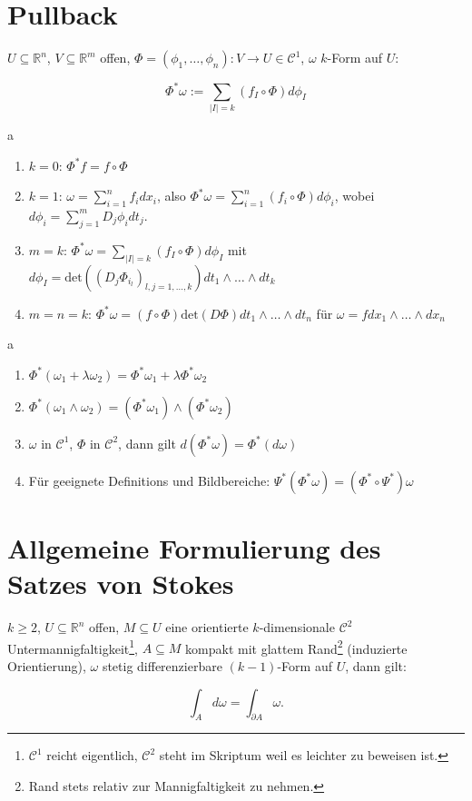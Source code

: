 \section{Pullback}
\begin{definition}[Pullback]
	$U\subseteq\mathbb R^n$, $V\subseteq\mathbb R^m$ offen, $\Phi = (\phi_1,\dots,\phi_n):V\rightarrow U \in \mathcal C^1$, $\omega$ $k$-Form auf $U$:

$$\Phi^*\omega := \sum_{|I|=k} (f_I\circ\Phi)d\phi_I$$
\end{definition}
\begin{remark}a\newline
	\begin{enumerate}
		\item $k=0$: $\Phi^*f = f\circ\Phi$
		\item $k=1$: $\omega = \sum_{i=1}^n f_i dx_i$, also $\Phi^*\omega = \sum_{i=1}^n (f_i\circ\Phi) d\phi_i$, wobei $d\phi_i = \sum_{j=1}^m D_j\phi_i dt_j$.
		\item $m=k$: $\Phi^*\omega = \sum_{|I|=k}(f_I\circ \Phi)d\phi_I$ mit $d\phi_I = \text{det}((D_j\Phi_{i_l})_{l,j=1,\dots,k})dt_1\wedge\dots\wedge dt_k$
		\item $m=n=k$: $\Phi^*\omega = (f\circ\Phi)\text{det}(D\Phi)dt_1\wedge\dots\wedge dt_n$ f\"ur $\omega = fdx_1\wedge\dots\wedge dx_n$
	\end{enumerate}
\end{remark}

\begin{theorem}a\newline
	\begin{enumerate}
		\item $\Phi^*(\omega_1+\lambda\omega_2) = \Phi^*\omega_1 + \lambda\Phi^*\omega_2$
		\item $\Phi^*(\omega_1\wedge\omega_2) = (\Phi^*\omega_1)\wedge(\Phi^*\omega_2)$
		\item $\omega$ in $\mathcal C^1$, $\Phi$ in $\mathcal C^2$, dann gilt $d(\Phi^*\omega)=\Phi^*(d\omega)$
		\item F\"ur geeignete Definitions und Bildbereiche: $\Psi^*(\Phi^*\omega)=(\Phi^*\circ\Psi^*)\omega$
	\end{enumerate}
\end{theorem}






\section{Allgemeine Formulierung des Satzes von Stokes}
\begin{theorem}
	$k\geq 2$, $U\subseteq\mathbb R^n$ offen, $M\subseteq U$ eine orientierte $k$-dimensionale $\mathcal C^2$ Untermannigfaltigkeit\footnote{$\mathcal C^1$ reicht eigentlich, $\mathcal C^2$ steht im Skriptum weil es leichter zu beweisen ist.}, $A\subseteq M$ kompakt mit glattem Rand\footnote{Rand stets relativ zur Mannigfaltigkeit zu nehmen.} (induzierte Orientierung), $\omega$ stetig differenzierbare $(k-1)$-Form auf $U$, dann gilt:
	
	$$\int_A d\omega = \int_{\partial A} \omega.$$
\end{theorem}


